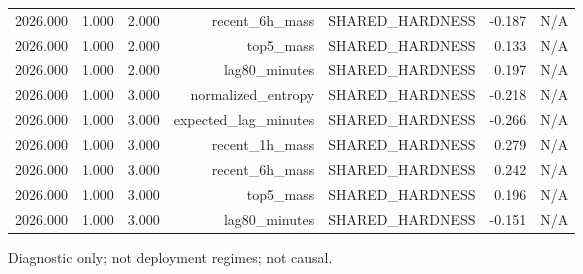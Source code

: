 \begin{table}[h!]
\begin{tabular}{lrrrrrr}
2026.000 & 1.000 & 2.000 & recent\_6h\_mass & SHARED\_HARDNESS & -0.187 & N/A \\
2026.000 & 1.000 & 2.000 & top5\_mass & SHARED\_HARDNESS & 0.133 & N/A \\
2026.000 & 1.000 & 2.000 & lag80\_minutes & SHARED\_HARDNESS & 0.197 & N/A \\
2026.000 & 1.000 & 3.000 & normalized\_entropy & SHARED\_HARDNESS & -0.218 & N/A \\
2026.000 & 1.000 & 3.000 & expected\_lag\_minutes & SHARED\_HARDNESS & -0.266 & N/A \\
2026.000 & 1.000 & 3.000 & recent\_1h\_mass & SHARED\_HARDNESS & 0.279 & N/A \\
2026.000 & 1.000 & 3.000 & recent\_6h\_mass & SHARED\_HARDNESS & 0.242 & N/A \\
2026.000 & 1.000 & 3.000 & top5\_mass & SHARED\_HARDNESS & 0.196 & N/A \\
2026.000 & 1.000 & 3.000 & lag80\_minutes & SHARED\_HARDNESS & -0.151 & N/A \\
\bottomrule
\end{tabular}
\vspace{4pt}
\footnotesize{Diagnostic only; not deployment regimes; not causal.}\\
\end{table}
